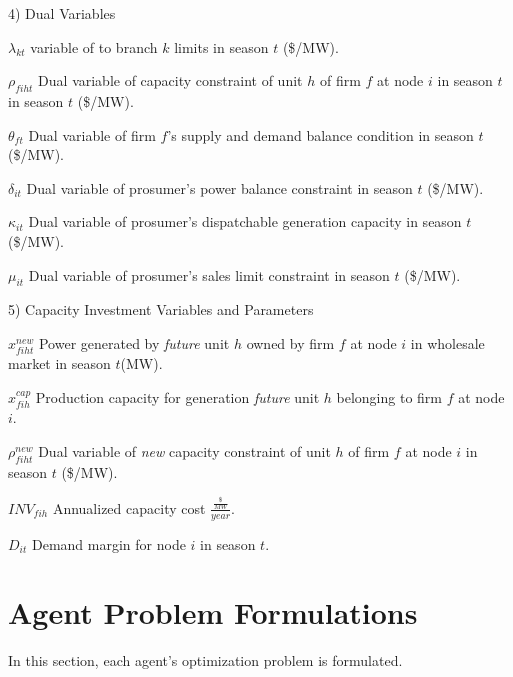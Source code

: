 \documentclass[12pt,onecolumn]{IEEEtran}
\theoremstyle{plain}
\theoremstyle{definition}
\begin{document}
4) Dual Variables
\begin{IEEEdescription}
\item[$\lambda_{kt}$] variable of to branch $k$ limits in season $t$ (\$/MW).
\item[$\rho_{fiht}$] Dual variable of capacity constraint of unit $h$ of firm $f$ at node $i$ in season $t$ in season $t$ (\$/MW).
\item[$\theta_{ft}$] Dual variable of firm $f$'s supply and demand balance condition in season $t$ (\$/MW).
\item[$\delta_{it}$] Dual variable of prosumer's power balance constraint in season $t$ (\$/MW).
\item[$\kappa_{it}$] Dual variable of prosumer's dispatchable generation capacity in season $t$ (\$/MW).
\item[$\mu_{it}$] Dual variable of prosumer's sales limit constraint in season $t$ (\$/MW).
\end{IEEEdescription}

5) Capacity Investment Variables and Parameters
\begin{IEEEdescription}
\item[$x^{new}_{fiht}$] Power generated by \textit{future} unit $h$ owned by firm $f$ at node $i$ in wholesale market in season $t$(MW).
\item[$x^{cap}_{fih}$] Production capacity for generation \textit{future} unit $h$ belonging to firm $f$ at node $i$.
\item[$\rho^{new}_{fiht}$] Dual variable of \textit{new} capacity constraint of unit $h$ of firm $f$ at node $i$ in season $t$ (\$/MW).
\item[$INV_{fih}$] Annualized capacity cost $\frac{\frac{\$}{MW}}{year}$.
\item[$D_{it}$] Demand margin for node $i$ in season $t$.
\end{IEEEdescription}

\section{Agent Problem Formulations}
In this section, each agent's optimization problem is formulated.
\end{document}
